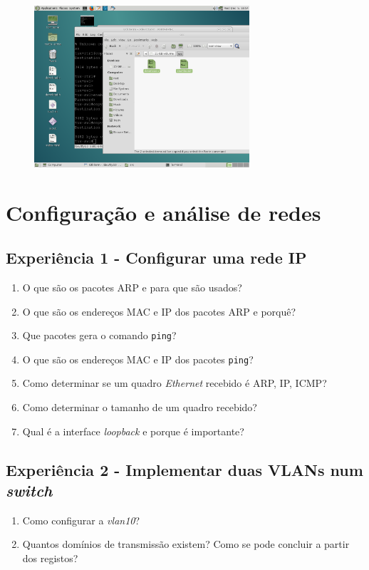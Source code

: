 \documentclass{article}
\begin{document}
\begin{figure}[t]
\includegraphics[width=8cm]{images/screen_dl_2.png}
\end{figure}

\begin{figure}
\end{figure}
\section{Configuração e análise de redes}
\subsection{Experiência 1 - Configurar uma rede IP}
\begin{enumerate}
\item O que são os pacotes ARP e para que são usados?

\item O que são os endereços MAC e IP dos pacotes ARP e porquê?

\item Que pacotes gera o comando \texttt{ping}?

\item O que são os endereços MAC e IP dos pacotes \texttt{ping}?

\item Como determinar se um quadro \textit{Ethernet} recebido é ARP, IP, ICMP?

\item Como determinar o tamanho de um quadro recebido?

\item Qual é a interface \textit{loopback} e porque é importante?
\end{enumerate}
\subsection{Experiência 2 - Implementar duas VLANs num \textit{switch}}
\begin{enumerate}
\item Como configurar a \textit{vlan10}?

\item Quantos domínios de transmissão existem? Como se pode concluir a partir dos registos?
\end{enumerate}
\end{document}
